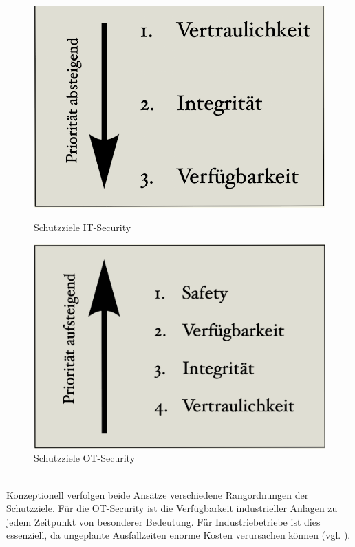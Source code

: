 \begin{figure}[h]
    \centering
    \begin{minipage}{0.45\textwidth}
        \centering
        \includegraphics[scale=.4]{images/ITS.png}
        \caption{Schutzziele IT-Security}
        \label{fig:meine-grafik1}
    \end{minipage}
    \hfill
    \begin{minipage}{0.45\textwidth}
        \centering
        \includegraphics[scale=.37]{images/OTS.png}
        \caption{Schutzziele OT-Security}
        \label{fig:meine-grafik2}
    \end{minipage}
\end{figure}
\\ Konzeptionell verfolgen beide Ansätze verschiedene Rangordnungen der Schutzziele. Für die OT-Security ist die Verfügbarkeit industrieller Anlagen zu jedem Zeitpunkt von besonderer Bedeutung. Für Industriebetriebe ist dies essenziell, da ungeplante Ausfallzeiten enorme Kosten verursachen können (vgl. \cite{OTS/ITS}). 
